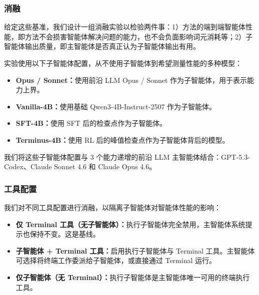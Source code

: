 \documentclass[sigconf,review]{acmart}
\begin{document}
\subsubsection{消融}
给定这些基准，我们设计一组消融实验以检验两件事：1）方法的端到端智能体性能，即方法不会损害智能体解决问题的能力，也不会负面影响词元消耗等；2）子智能体输出质量，即主智能体是否真正认为子智能体输出有用。

实验使用以下子智能体配置，从不使用子智能体到希望测量性能的多种模型：
\begin{itemize}
    \item \textbf{Opus / Sonnet：}使用前沿 LLM Opus / Sonnet 作为子智能体，用于表示能力上界。
    \item \textbf{Vanilla-4B：}使用基础 Qwen3-4B-Instruct-2507 作为子智能体。
    \item \textbf{SFT-4B：}使用 SFT 后的检查点作为子智能体。
    \item \textbf{Terminus-4B：}使用 RL 后的峰值检查点作为子智能体背后的模型。
\end{itemize}

我们将这些子智能体配置与 3 个能力递增的前沿 LLM 主智能体结合：GPT-5.3-Codex、Claude Sonnet 4.6 和 Claude Opus 4.6。

\subsubsection{工具配置}
我们对不同工具配置进行消融，以隔离子智能体对智能体性能的影响：
\begin{itemize}
    \item \textbf{仅 Terminal 工具（无子智能体）：}执行子智能体完全禁用，主智能体系统提示也保持不变。这是基线。
    \item \textbf{子智能体 + Terminal 工具：}启用执行子智能体与 Terminal 工具。主智能体可选择将终端工作委派给子智能体，或直接通过 Terminal 运行。
    \item \textbf{仅子智能体（无 Terminal）：}执行子智能体是主智能体唯一可用的终端执行工具。
\end{itemize}
\end{document}
